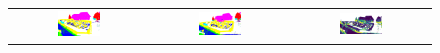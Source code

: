 \begin{figure}[h!]
\begin{tabular}{ccc}
            \includegraphics[width=0.33\textwidth, height=0.18\textheight]{images/seg_output/sem3d_seg_output/2_GT.pdf} &
            \includegraphics[width=0.33\textwidth, height=0.18\textheight]{images/seg_output/sem3d_seg_output/2_Pred.pdf}& 
            \includegraphics[width=0.33\textwidth, height=0.18\textheight]{images/seg_output/sem3d_seg_output/ent_de_2.pdf}\\


\end{tabular}
\end{figure}
